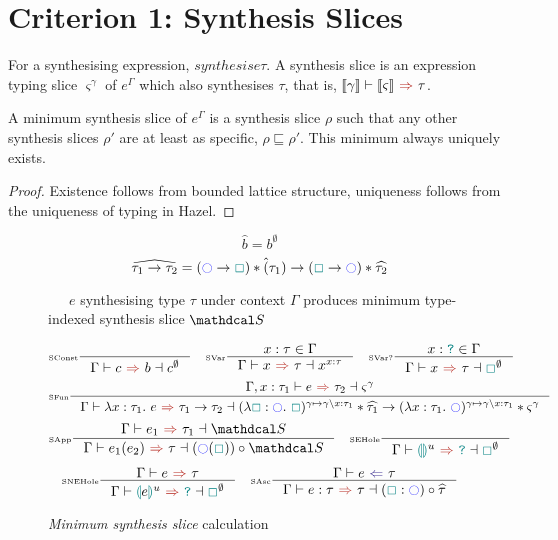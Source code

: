 \section{Criterion 1: Synthesis Slices}
\label{sec:SynthesisSlicesJudgement}
\begin{definition}
For a synthesising expression, $synthesis{e}{\tau}$. A synthesis slice is an expression typing slice $\varsigma^{\gamma}$ of $e^\Gamma$ which also synthesises $\tau$, that is, $\synthesis[\type{\gamma}]{\type{\varsigma}}{\tau}$.
\end{definition}
\begin{proposition}
A minimum synthesis slice of $e^\Gamma$ is a synthesis slice $\rho$ such that any other synthesis slices $\rho'$ are at least as specific, $\rho \sqsubseteq \rho'$. This minimum always uniquely exists.
\end{proposition}
\begin{proof}
Existence follows from bounded lattice structure, uniqueness follows from the uniqueness of typing in Hazel.
\end{proof}
\begin{definition}
\[\widehat{b} = b^\emptyset\]
\[\widehat{\tau_1 \to \tau_2} = (\cmark \to \gap) * \hat(\tau_1) \to (\gap \to \cmark) * \widehat{\tau_2}\]
\end{definition}
\newcommand{\id}{\mathrm{id}}
\begin{figure}[H]
\ \ \ $e$ synthesising type $\tau$ under context $\Gamma$ produces minimum type-indexed synthesis slice $\S$

\[\inference[\tiny SConst]{}{\synthesisslice{c}{b}{c^\emptyset}} \quad
\inference[\tiny SVar]{x : \tau \in \Gamma}{\synthesisslice{x}{\tau}{x^{x:\tau}}} \quad
\inference[\tiny SVar?]{x : \dyn \in \Gamma}{\synthesisslice{x}{\tau}{\gap^\emptyset}}\]
\[\inference[\tiny SFun]{\synthesisslice[\Gamma,x:\tau_1]{e}{\tau_2}{\varsigma^{\gamma}}}{\synthesisslice{\lambda x:\tau_1.\ e}{\tau_1 \to \tau_2}{(\lambda \gap : \cmark.\ \gap)^{\gamma \mapsto \gamma\backslash x: \tau_1} * \widehat{\tau_1} \to (\lambda x : \tau_1.\ \cmark)^{\gamma \mapsto \gamma\backslash x: \tau_1} * \varsigma^\gamma}}\]
\[\inference[\tiny SApp]{\synthesisslice{e_1}{\tau_1}{\S}}{\synthesisslice{e_1(e_2)}{\tau}{(\cmark(\gap)) \circ \S}} \quad 
\inference[\tiny SEHole]{}{\synthesisslice{\hole^u}{\dyn}{\gap^\emptyset}}\]
\[\inference[\tiny SNEHole]{\synthesis{e}{\tau}}{\synthesisslice{\hole[e]^u}{\dyn}{\gap^\emptyset}}\quad 
\inference[\tiny SAsc]{\analysis{e}{\tau}}{\synthesisslice{e : \tau}{\tau}{(\gap : \cmark) \circ \widehat{\tau}}}\]

\caption{\textit{Minimum synthesis slice} calculation}
\label{fig:SynthesisSlices}
\end{figure} 


